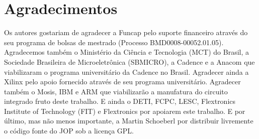 \documentclass[10pt,twocolumn]{article}
\begin{document}
\section*{Agradecimentos}
	Os autores gostariam de agradecer a Funcap pelo suporte financeiro através do seu programa de bolsas de mestrado (Processo BMD0008-00052.01.05). Agradecemos também o Ministério da Ciência e Tecnologia (MCT) do Brasil, a Sociedade Brasileira de Microeletrônica (SBMICRO), a Cadence e a Anacom que viabilizaram o programa universitário da Cadence no Brasil. Agradecer ainda a Xilinx pelo apoio fornecido através de seu programa universitário. Agradecer também o Mosis, IBM e ARM que viabilizarão a manufatura do circuito integrado fruto deste trabalho. E ainda o DETI, FCPC, LESC, Flextronics Institute of Technology (FIT) e Flextronics por apoiarem este trabalho. E por último, mas não menos importante, a Martin Schoeberl por distribuir livremente o código fonte do JOP sob a licença GPL.










%
\end{document}
